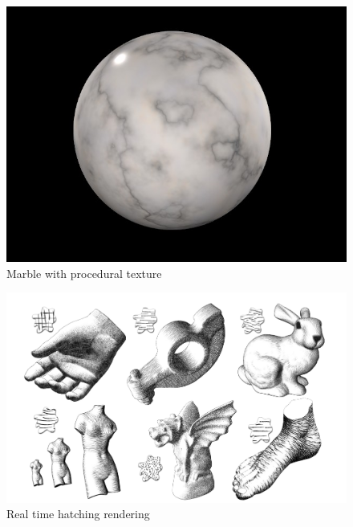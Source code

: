 \begin{figure}
    \begin{center}
    \includegraphics[scale=0.2]{images/marble.jpg}
    \end{center}
    \caption{Marble with procedural texture}
    \label{marble_rendering}
\end{figure}


\begin{figure}
    \begin{center}
    \includegraphics[scale=0.2]{pics/hatching.png}
    \end{center}
    \caption{Real time hatching rendering \cite{praun_real-time_2001}}
    \label{hatching_rendering}
\end{figure}

